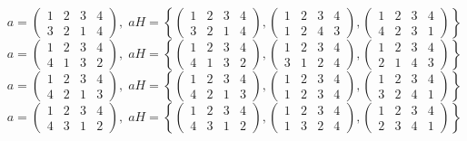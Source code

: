 \documentclass[a4paper,12pt]{article}
\begin{document}
\begin{itemize}
\[a = \begin{pmatrix} 1 & 2 & 3 & 4 \\ 3&2&1&4\end{pmatrix}, \; aH = \left\{\begin{pmatrix} 1 & 2 & 3 & 4 \\ 3&2&1&4\end{pmatrix}, \begin{pmatrix} 1 & 2 & 3 & 4 \\ 1&2&4&3\end{pmatrix}, \begin{pmatrix} 1 & 2 & 3 & 4 \\ 4&2&3&1\end{pmatrix} \right\}\]
\[a = \begin{pmatrix} 1 & 2 & 3 & 4 \\ 4&1&3&2\end{pmatrix}, \; aH = \left\{\begin{pmatrix} 1 & 2 & 3 & 4 \\ 4&1&3&2\end{pmatrix}, \begin{pmatrix} 1 & 2 & 3 & 4 \\ 3&1&2&4\end{pmatrix}, \begin{pmatrix} 1 & 2 & 3 & 4 \\ 2&1&4&3\end{pmatrix} \right\}\]
\[a = \begin{pmatrix} 1 & 2 & 3 & 4 \\ 4&2&1&3\end{pmatrix}, \; aH = \left\{\begin{pmatrix} 1 & 2 & 3 & 4 \\ 4&2&1&3\end{pmatrix}, \begin{pmatrix} 1 & 2 & 3 & 4 \\ 1&2&3&4\end{pmatrix}, \begin{pmatrix} 1 & 2 & 3 & 4 \\ 3&2&4&1\end{pmatrix} \right\}\]
\[a = \begin{pmatrix} 1 & 2 & 3 & 4 \\ 4&3&1&2\end{pmatrix}, \; aH = \left\{\begin{pmatrix} 1 & 2 & 3 & 4 \\ 4&3&1&2\end{pmatrix}, \begin{pmatrix} 1 & 2 & 3 & 4 \\ 1&3&2&4\end{pmatrix}, \begin{pmatrix} 1 & 2 & 3 & 4 \\ 2&3&4&1\end{pmatrix} \right\}\]


\end{itemize}
\end{document}
